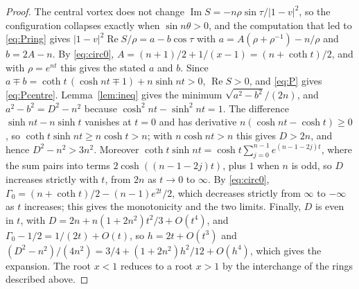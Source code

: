 \documentclass[11pt]{article}
\theoremstyle{definition}
\newcommand{\re}{\operatorname{Re}}
\newcommand{\im}{\operatorname{Im}}
\begin{document}
\begin{proof}
The central vortex does not change $\im S = -n\rho\sin\tau/|1 - v|^2$, so the configuration collapses exactly when $\sin n\theta > 0$, and the computation that led to \eqref{eq:Pring} gives $|1 - v|^2 \re S/\rho = a - b\cos\tau$ with $a = A(\rho + \rho^{-1}) - n/\rho$ and $b = 2A - n$. By \eqref{eq:circ0}, $A = (n + 1)/2 + 1/(x - 1) = (n + \coth t)/2$, and with $\rho = e^{nt}$ this gives the stated $a$ and $b$. Since $a \mp b = \coth t\,(\cosh nt \mp 1) + n\sinh nt > 0$, $\re S > 0$, and \eqref{eq:P} gives \eqref{eq:Pcentre}. Lemma~\ref{lem:ineq} gives the minimum $\sqrt{a^2 - b^2}/(2n)$, and $a^2 - b^2 = D^2 - n^2$ because $\cosh^2 nt - \sinh^2 nt = 1$. The difference $\sinh nt - n\sinh t$ vanishes at $t = 0$ and has derivative $n(\cosh nt - \cosh t) \ge 0$, so $\coth t\sinh nt \ge n\cosh t > n$; with $n\cosh nt > n$ this gives $D > 2n$, and hence $D^2 - n^2 > 3n^2$. Moreover $\coth t\sinh nt = \cosh t\sum_{j=0}^{n-1} e^{(n - 1 - 2j)t}$, where the sum pairs into terms $2\cosh((n - 1 - 2j)t)$, plus $1$ when $n$ is odd, so $D$ increases strictly with $t$, from $2n$ as $t \to 0$ to $\infty$. By \eqref{eq:circ0}, $\Gamma_0 = (n + \coth t)/2 - (n - 1)e^{2t}/2$, which decreases strictly from $\infty$ to $-\infty$ as $t$ increases; this gives the monotonicity and the two limits. Finally, $D$ is even in $t$, with $D = 2n + n(1 + 2n^2)t^2/3 + O(t^4)$, and $\Gamma_0 - 1/2 = 1/(2t) + O(t)$, so $h = 2t + O(t^3)$ and $(D^2 - n^2)/(4n^2) = 3/4 + (1 + 2n^2)h^2/12 + O(h^4)$, which gives the expansion. The root $x < 1$ reduces to a root $x > 1$ by the interchange of the rings described above.
\end{proof}
\end{document}

